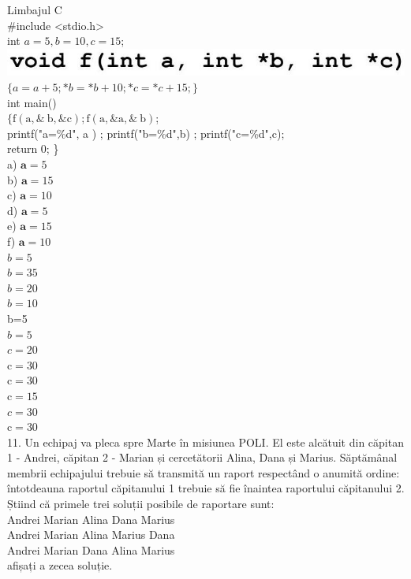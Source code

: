 \documentclass[10pt]{article}
\begin{document}
Limbajul C\\
\#include <stdio.h>\\
int $a=5, b=10, c=15$;\\
\includegraphics[max width=\textwidth, center]{2025_04_17_46e04c6acd873ea9558dg-116}\\
$\{a=a+5 ; * b=* b+10 ; * c=* c+15 ;\}$\\
int main()\\
$\{\mathrm{f}(\mathrm{a}, \& \mathrm{~b}, \& \mathrm{c}) ; \mathrm{f}(\mathrm{a}, \& \mathrm{a}, \& \mathrm{~b})$;\\
printf("a=\%d", a ) ; printf("b=\%d",b) ; printf("c=\%d",c);\\
return 0; \}\\
a) $\mathbf{a}=5$\\
b) $\mathbf{a}=15$\\
c) $\mathbf{a}=10$\\
d) $\mathbf{a}=5$\\
e) $\mathbf{a}=15$\\
f) $\mathbf{a}=10$\\
$b=5$\\
$b=35$\\
$b=20$\\
$b=10$\\
b=5\\
$b=5$\\
$c=20$\\
$\mathrm{c}=30$\\
$\mathrm{c}=30$\\
$\mathrm{c}=15$\\
$c=30$\\
$\mathrm{c}=30$\\
11. Un echipaj va pleca spre Marte în misiunea POLI. El este alcătuit din căpitan 1 - Andrei, căpitan 2 - Marian și cercetătorii Alina, Dana și Marius. Săptămânal membrii echipajului trebuie să transmită un raport respectând o anumită ordine: întotdeauna raportul căpitanului 1 trebuie să fie înaintea raportului căpitanului 2. Știind că primele trei soluții posibile de raportare sunt:\\
Andrei Marian Alina Dana Marius\\
Andrei Marian Alina Marius Dana\\
Andrei Marian Dana Alina Marius\\
afișați a zecea soluție.\\
\end{document}

